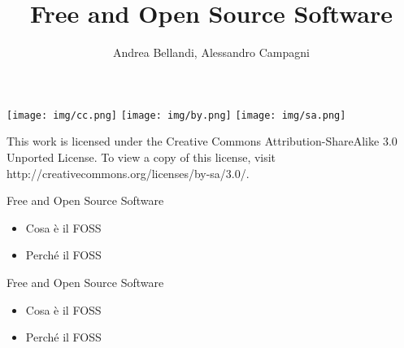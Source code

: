 \documentclass{beamer}
\title{Free and Open Source Software}
\author{Andrea Bellandi, Alessandro Campagni}
\begin{document}
\begin{frame}
  \titlepage

\vfill
\texttt{[image: img/cc.png]}
\texttt{[image: img/by.png]}
\texttt{[image: img/sa.png]}

This work is licensed under the Creative Commons Attribution-ShareAlike 3.0 Unported License. To view a copy of this license, visit http://creativecommons.org/licenses/by-sa/3.0/.
\end{frame}

\begin{frame}{Free and Open Source Software}

  \begin{itemize}
    \item Cosa \`e il FOSS
    \item Perch\'e il FOSS
  \end{itemize}

\end{frame}

\begin{frame}{Free and Open Source Software}

  \begin{itemize}
    \item Cosa \`e il FOSS
      
    \item Perch\'e il FOSS
  \end{itemize}

\end{frame}
\end{document}
